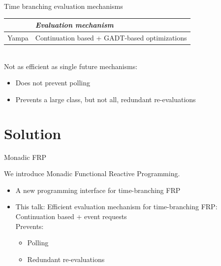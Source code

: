 \documentclass{beamer}
\begin{document}
\begin{frame}{Time branching evaluation mechanisms}
\begin{tabular}{l l}
 & \emph{Evaluation mechanism}  \\
\hline
Yampa & Continuation based + GADT-based optimizations  \\
\end{tabular}\\
\vspace{0.2cm}
Not as efficient as single future mechanisms: 
\begin{itemize}
\item Does not prevent polling
\item Prevents a large class, but not all, redundant re-evaluations
\end{itemize}
\end{frame}
\section{Solution}

\begin{frame}{Monadic FRP}

We introduce Monadic Functional Reactive Programming.
\begin{itemize}
\item A new programming interface for time-branching  FRP
\item \alert{This talk:} Efficient evaluation mechanism for time-branching FRP: \\
 Continuation based + event requests\\
Prevents:
\begin{itemize}
\item Polling
\item Redundant re-evaluations
\end{itemize}
\end{itemize}
\end{frame}

\newlength{\tmathindenta}
\setlength{\tmathindenta}{\mathindent}
\setlength{\mathindent}{0.05cm}
\end{document}
